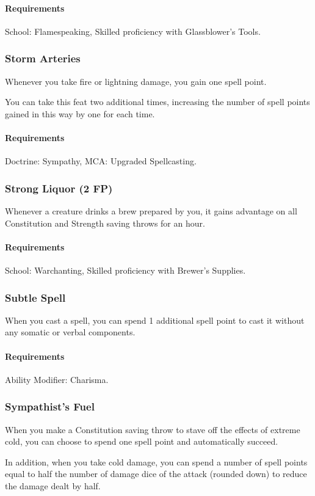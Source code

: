     \paragraph{Requirements} School: Flamespeaking, Skilled proficiency with Glassblower's Tools.
\subsubsection{Storm Arteries} \label{feat::stormarteries}
    Whenever you take fire or lightning damage, you gain one spell point.

    You can take this feat two additional times, increasing the number of spell points gained in this way by one for each time.
    \paragraph{Requirements} Doctrine: Sympathy, MCA: Upgraded Spellcasting.
\subsubsection{Strong Liquor (2 FP)} \label{feat::strongliquor}
    Whenever a creature drinks a brew prepared by you, it gains advantage on all Constitution and Strength saving throws for an hour.
    \paragraph{Requirements} School: Warchanting, Skilled proficiency with Brewer's Supplies.
\subsubsection{Subtle Spell} \label{feat::subtlespell}
    When you cast a spell, you can spend 1 additional spell point to cast it without any somatic or verbal components.
    \paragraph{Requirements} Ability Modifier: Charisma.
\subsubsection{Sympathist's Fuel} \label{feat::sympathistsfuel}
    When you make a Constitution saving throw to stave off the effects of extreme cold, you can choose to spend one spell point and automatically succeed.

    In addition, when you take cold damage, you can spend a number of spell points equal to half the number of damage dice of the attack (rounded down) to reduce the damage dealt by half.
